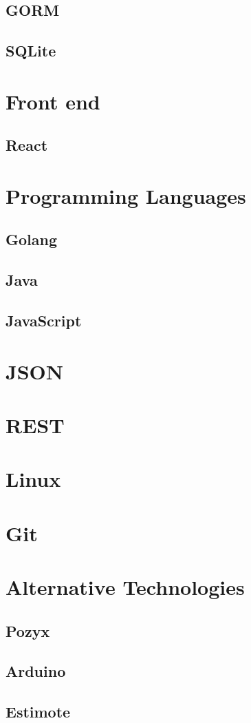\documentclass[../Main/thesis.tex]{subfiles}
\begin{document}
\subsection{GORM}
\subsection{SQLite}


\section{Front end}
\subsection{React}

\section{Programming Languages}
\subsection{Golang}
\subsection{Java}
\subsection{JavaScript}

\section{JSON}

\section{REST}

\section{Linux}

\section{Git}


\section{Alternative Technologies}
\subsection{Pozyx}
\subsection{Arduino}
\subsection{Estimote}



\onlyinsubfile{}
\onlyinsubfile{}
\end{document}
